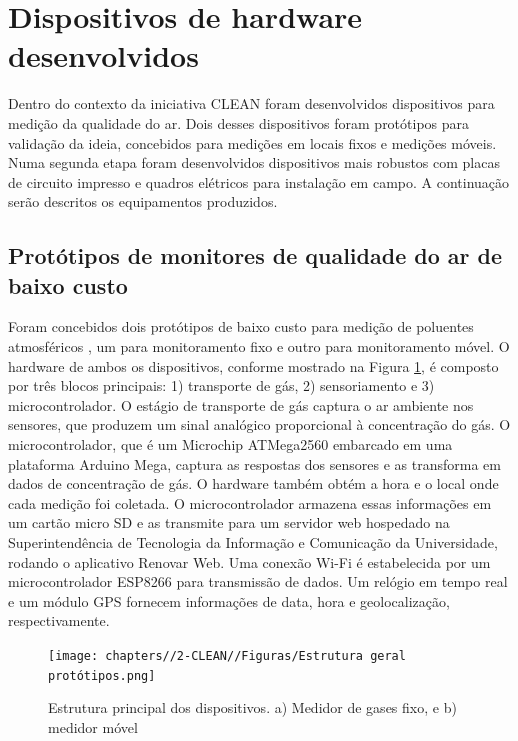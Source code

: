 

\section{Dispositivos de hardware desenvolvidos}

Dentro do contexto da iniciativa CLEAN foram desenvolvidos dispositivos para medição da qualidade do ar. Dois desses dispositivos foram protótipos para validação da ideia, concebidos para medições em locais fixos e medições móveis. Numa segunda etapa foram desenvolvidos dispositivos mais robustos com placas de circuito impresso e quadros elétricos para instalação em campo. A continuação serão descritos os equipamentos produzidos.

\subsection{Protótipos de monitores de qualidade do ar de baixo custo}

Foram concebidos dois protótipos de baixo custo para medição de poluentes atmosféricos \cite{Campo2020DEPLOYMENTRESULTS}, um para monitoramento fixo e outro para monitoramento móvel. O hardware de ambos os dispositivos, conforme mostrado na Figura \ref{fig:device-structure}, é composto por três blocos principais: 1) transporte de gás, 2) sensoriamento e 3) microcontrolador. O estágio de transporte de gás captura o ar ambiente nos sensores, que produzem um sinal analógico proporcional à concentração do gás. O microcontrolador, que é um Microchip ATMega2560 embarcado em uma plataforma Arduino Mega, captura as respostas dos sensores e as transforma em dados de concentração de gás. O hardware também obtém a hora e o local onde cada medição foi coletada. O microcontrolador armazena essas informações em um cartão micro SD e as transmite para um servidor web hospedado na Superintendência de Tecnologia da Informação e Comunicação da Universidade, rodando o aplicativo Renovar Web. Uma conexão Wi-Fi é estabelecida por um microcontrolador ESP8266 para transmissão de dados. Um relógio em tempo real e um módulo GPS fornecem informações de data, hora e geolocalização, respectivamente.

\begin{figure}
    \centering
    \caption{Estrutura principal dos dispositivos. a) Medidor de gases fixo, e b) medidor móvel}
    \texttt{[image: chapters//2-CLEAN//Figuras/Estrutura geral protótipos.png]}
    \label{fig:device-structure}
\end{figure}

